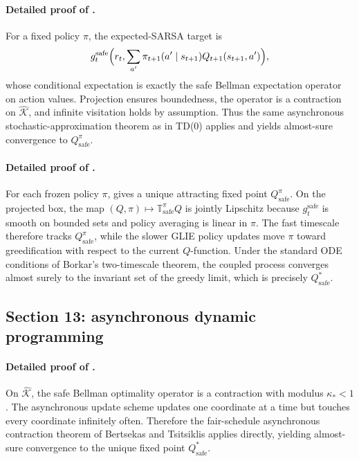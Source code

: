 \documentclass{article}
\theoremstyle{remark}
\newcommand{\safe}{\mathrm{safe}}
\newcommand{\Ksafe}{\widehat{\mathcal K}}
\begin{document}
\paragraph{Detailed proof of .}
For a fixed policy $\pi$, the expected-SARSA target is
\[
g_t^{\safe}\Bigl(r_t,\sum_{a'}\pi_{t+1}(a'\mid s_{t+1})Q_{t+1}(s_{t+1},a')\Bigr),
\]
whose conditional expectation is exactly the safe Bellman expectation operator on action values.
Projection ensures boundedness, the operator is a contraction on $\Ksafe$, and infinite visitation holds by assumption.
Thus the same asynchronous stochastic-approximation theorem as in TD(0) applies and yields almost-sure convergence to $Q_\safe^\pi$.

\paragraph{Detailed proof of .}
For each frozen policy $\pi$,  gives a unique attracting fixed point $Q_\safe^\pi$.
On the projected box, the map $(Q,\pi)\mapsto \mathbb T_\safe^\pi Q$ is jointly Lipschitz because $g_t^{\safe}$ is smooth on bounded sets and policy averaging is linear in $\pi$.
The fast timescale therefore tracks $Q_\safe^\pi$, while the slower GLIE policy updates move $\pi$ toward greedification with respect to the current $Q$-function.
Under the standard ODE conditions of Borkar's two-timescale theorem, the coupled process converges almost surely to the invariant set of the greedy limit, which is precisely $Q_\safe^*$.

\subsection{Section 13: asynchronous dynamic programming}
\label{app:async}

\paragraph{Detailed proof of .}
On $\Ksafe$, the safe Bellman optimality operator is a contraction with modulus $\kappa_*<1$.
The asynchronous update scheme updates one coordinate at a time but touches every coordinate infinitely often.
Therefore the fair-schedule asynchronous contraction theorem of Bertsekas and Tsitsiklis applies directly, yielding almost-sure convergence to the unique fixed point $Q_\safe^*$.



\end{document}
